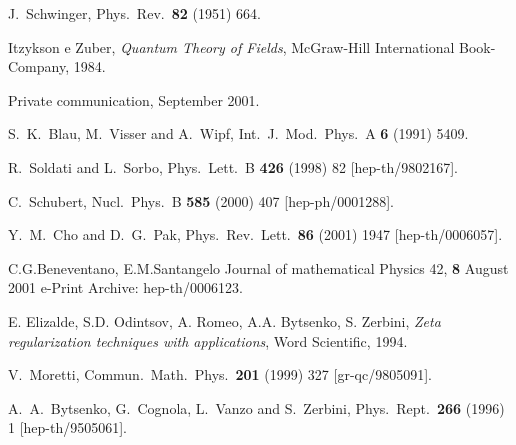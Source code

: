 \documentclass [11pt]{article}
\begin{document}
\begin{thebibliography}{10}

J.~Schwinger,
Phys.\ Rev.\  {\bf 82} (1951) 664.

Itzykson e Zuber, \emph{Quantum Theory of Fields}, McGraw-Hill International
Book-Company, 1984.

Private communication, September 2001.

S.~K.~Blau, M.~Visser and A.~Wipf,
Int.\ J.\ Mod.\ Phys.\ A {\bf 6} (1991) 5409.

R.~Soldati and L.~Sorbo,
Phys.\ Lett.\ B {\bf 426} (1998) 82
[hep-th/9802167].

C.~Schubert,
Nucl.\ Phys.\ B {\bf 585} (2000) 407
[hep-ph/0001288].

Y.~M.~Cho and D.~G.~Pak,
Phys.\ Rev.\ Lett.\  {\bf 86} (2001) 1947
[hep-th/0006057].

C.G.Beneventano, E.M.Santangelo Journal of mathematical Physics 42, {\bf 8} August 2001 e-Print Archive: hep-th/0006123.

E. Elizalde, S.D. Odintsov, A. Romeo, A.A. Bytsenko, S. Zerbini, 
\emph{Zeta regularization
techniques with applications}, Word Scientific, 1994.


V.~Moretti,
Commun.\ Math.\ Phys.\  {\bf 201} (1999) 327
[gr-qc/9805091].

A.~A.~Bytsenko, G.~Cognola, L.~Vanzo and S.~Zerbini,
Phys.\ Rept.\  {\bf 266} (1996) 1
[hep-th/9505061].


\end{thebibliography}
\end{document}
